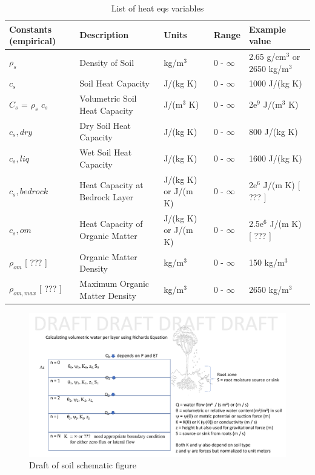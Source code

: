 \documentclass{article}
\begin{document}
\begin{table}[]
{\begin{tabular}{lllll}
\hline
Constants (empirical) & Description   & Units     & Range & Example value \\ \hline
$\rho_s$       & Density of Soil & kg/m$^3$ & 0 - $\infty$       & 2.65 g/cm$^{3}$ or 2650 kg/m$^{3}$ \\
$c_s$       & Soil Heat Capacity & J/(kg K) & 0 - $\infty$       & 1000 J/(kg K) \\
$C_s$ =  $\rho_s$  $c_s$    & Volumetric Soil Heat Capacity & J/(m$^3$ K) & 0 - $\infty$       & 2e$^{9}$ J/(m$^3$ K) \\
$c_s,dry$       & Dry Soil Heat Capacity & J/(kg K) & 0 - $\infty$       & 800 J/(kg K) \\
$c_s,liq$       & Wet Soil Heat Capacity & J/(kg K) & 0 - $\infty$       & 1600 J/(kg K) \\
$c_s,bedrock$       & Heat Capacity at Bedrock Layer & J/(kg K) or J/(m K) & 0 - $\infty$       & 2e$^{6}$ J/(m K) [ ??? ] \\
$c_s,om$       & Heat Capacity of Organic Matter &  J/(kg K) or J/(m K) & 0 - $\infty$       & 2.5e$^{6}$ J/(m K) [ ??? ] \\
$\rho_{om}$ [ ??? ]  & Organic Matter Density & kg/m$^3$ & 0 - $\infty$       & 150 kg/m$^{3}$  \\
$\rho_{om,max}$ [ ??? ]  & Maximum Organic Matter Density &  kg/m$^3$ & 0 - $\infty$          &    2650 kg/m$^{3}$      \\

\hline
\end{tabular}%
}
\caption{List of heat eqs variables}
\end{table}

\begin{figure}[htb]
\includegraphics[scale=.15]{CLIMA-land/LM_figures/SoilSchematic-1.png}
\caption{Draft of soil schematic figure}
\end{figure}
\end{document}
